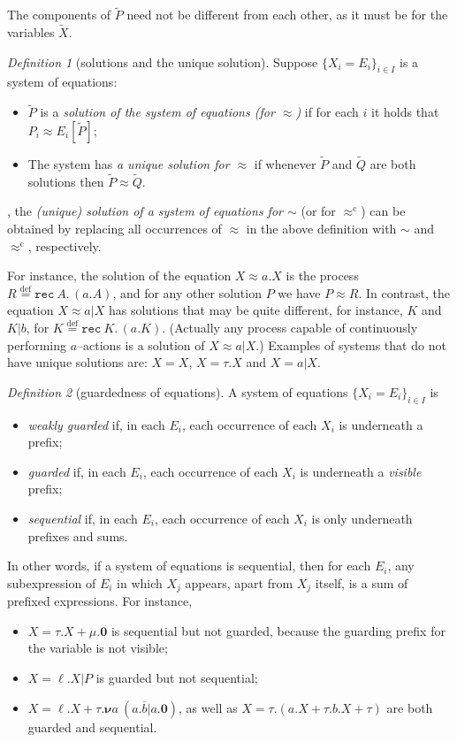 \documentclass[GCNS]{yincog}
\theoremstyle{remark}
\newtheorem{definition}{Definition}[section]
\theoremstyle{theorem}
\theoremstyle{remark}
\def\nil{{\boldsymbol 0}}
\def\res#1{{\boldsymbol \nu} #1\:}
\newcommand{\outC}[1]{\overline{#1}}
\def\DSdefi{\stackrel{\text{def}}{=}}
\renewcommand{\tilde}{\widetilde}
\newcommand{\recu}[2]{\mathtt{rec}\: #1 . #2}
\newcommand{\rapprox}{\mathrel{\approx^{\mathrm{c}}}}
\newcommand{\wbvtex}{\approx}
\newcommand{\til}{\tilde}
\begin{document}
The components of $\til P$ need not be different from each other, as it
must be for the variables $\til X$.

\begin{definition}[solutions and the unique solution]
 \label{def:solution}
Suppose $\{ X_i = E_i\}_{i\in I}$ is a system of equations:
%
\begin{itemize}
%
\item $\til P$ is a
\emph{solution of the system of equations (for $\wbvtex $)} if for each
$i$ it holds that $P_i \wbvtex E_i [\til P]$;
%
\item The system has \emph{a unique solution for $\wbvtex $} if whenever
$\til P$ and $\til Q$ are both solutions then
$\til P \wbvtex \til Q$.
%
\end{itemize}
%
\end{definition}
%
, the
\emph{(unique) solution of a system of equations for $\sim $} (or for
$\rapprox $) can be obtained by replacing all occurrences of
$\wbvtex $ in the above definition with $\sim $ and $\rapprox $, respectively.

For instance, the solution of the equation $X \wbvtex a. X$ is the process
$R \DSdefi \recu A {\, (a. A)}$, and for any other solution $P$ we have
$P \wbvtex R$. In contrast, the equation $X \wbvtex a| X$ has solutions
that may be quite different, for instance, $K$ and $K | b$, for
$K \DSdefi \recu K {\, (a. K)}$. (Actually any process capable of continuously
performing $a$--actions is a solution of $X \wbvtex a| X$.) Examples of
systems that do not have unique solutions are: $X = X$,
$X = \tau . X$ and $X = a | X$.

\begin{definition}[guardedness of equations]
 \label{def:guardness}
A system of equations $\{ X_i = E_i\}_{i\in I}$ is
%
\begin{itemize}
%
\item \emph{weakly guarded} if, in each $E_i$, each occurrence of each
$X_i$ is underneath a prefix;
%
\item \emph{guarded} if, in each $E_i$, each occurrence of each $X_i$ is
underneath a \emph{visible} prefix;
%
\item \emph{sequential} if, in each $E_i$, each occurrence of each
$X_i$ is only underneath prefixes and sums.
%
\end{itemize}
%
\end{definition}

In other words, if a system of equations is sequential, then for each
$E_i$, any subexpression of $E_i$ in which $X_j $ appears, apart from
$X_j$ itself, is a sum of prefixed expressions. For instance,
%
\begin{itemize}
%
\item $X = \tau . X + \mu . \nil $ is sequential but not guarded, because
the guarding prefix for the variable is not visible;
%
\item $X = \ell . X | P$ is guarded but not sequential;
%
\item $X = \ell . X + \tau . \res a (a .\outC b | a.\nil )$, as well as
$X = \tau . (a. X + \tau . b .X + \tau )$ are both guarded and sequential.
%
\end{itemize}
\end{document}
